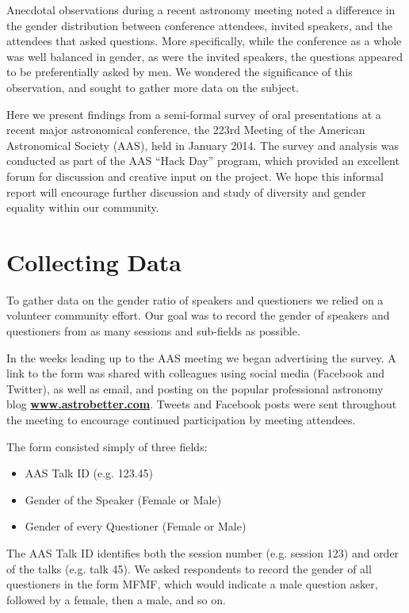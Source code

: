 \documentclass[iop]{emulateapj}
\begin{document}
Anecdotal observations during a recent astronomy meeting noted a difference in the gender distribution\footnotemark {} between conference attendees, invited speakers, and the attendees that asked questions. More specifically, while the conference as a whole was well balanced in gender, as were the invited speakers, the questions appeared to be preferentially asked by men. We wondered the significance of this observation, and sought to gather more data on the subject.


Here we present findings from a semi-formal survey of oral presentations at a recent major astronomical conference, the 223rd Meeting of the American Astronomical Society (AAS), held in January 2014. The survey and analysis was conducted as part of the AAS ``Hack Day'' program, which provided an excellent forum for discussion and creative input on the project. We hope this informal report will encourage further discussion and study of diversity and gender equality within our community.


\section{Collecting Data}
To gather data on the gender ratio of speakers and questioners we relied on a volunteer community effort. Our goal was to record the gender of speakers and questioners from as many sessions and sub-fields as possible. 

In the weeks leading up to the AAS meeting we began advertising the survey. A link to the form was shared with colleagues using social media (Facebook and Twitter), as well as email, and posting on the popular professional astronomy blog \href{http://www.astrobetter.com}{\bf{www.astrobetter.com}}. Tweets and Facebook posts were sent throughout the meeting to encourage continued participation by meeting attendees. 

The form consisted simply of three fields: 
\begin{itemize}
\item AAS Talk ID (e.g. 123.45)
\item Gender of the Speaker (Female or Male)
\item Gender of every Questioner (Female or Male)
\end{itemize}
The AAS Talk ID identifies both the session number (e.g. session 123) and order of the talks (e.g. talk 45). We asked respondents to record the gender of all questioners in the form MFMF, which would indicate a male question asker, followed by a female, then a male, and so on.
\end{document}
